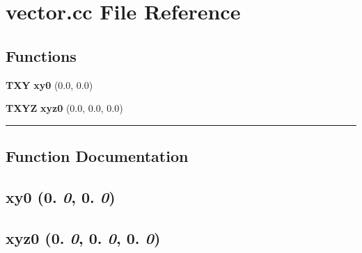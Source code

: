 \section{vector.cc File Reference}
\label{vector.cc}


\subsection*{Functions}
\begin{CompactItemize}
\item 
{\bf TXY} {\bf xy0} (0.0, 0.0)
\item 
{\bf TXYZ} {\bf xyz0} (0.0, 0.0, 0.0)
\end{CompactItemize}
\vspace{0.4cm}\hrule\vspace{0.2cm}
\subsection*{Function Documentation}
\label{vector.cc_a0}
\subsection{ xy0 (0. {\em 0}, 0. {\em 0})}

\label{vector.cc_a1}
\subsection{ xyz0 (0. {\em 0}, 0. {\em 0}, 0. {\em 0})}


